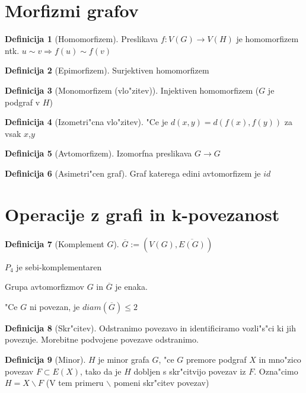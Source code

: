 \documentclass{article}
\theoremstyle{definition}
\newtheorem{definition}{Definicija}[section]
\begin{document}
	\section{Morfizmi grafov}
	
	\begin{definition}[Homomorfizem]
		Preslikava $f: V(G) \rightarrow V(H)$ je homomorfizem ntk. $u \sim v \Rightarrow f(u) \sim f(v)$
	\end{definition}
	\begin{definition}[Epimorfizem]
		Surjektiven homomorfizem 
	\end{definition}
	\begin{definition}[Monomorfizem (vlo"zitev)]
		Injektiven homomorfizem ($G$ je podgraf v $H$) 
	\end{definition}
	\begin{definition}[Izometri"cna vlo"zitev]
		"Ce je $d(x,y) = d(f(x), f(y))$ za vsak $x$,$y$
	\end{definition}
	\begin{definition}[Avtomorfizem]
		Izomorfna preslikava $G \rightarrow G$
	\end{definition}
	\begin{definition}[Asimetri"cen graf]
		Graf katerega edini avtomorfizem je $id$
	\end{definition}
	
	
	\section{Operacije z grafi in k-povezanost}	
	\begin{definition}[Komplement $G$]
		$\overline{G} := (V(G), \overline{E(G)})$
	\end{definition}
	$P_4$ je sebi-komplementaren
	
	Grupa avtomorfizmov $G$ in $\overline{G}$ je enaka.
	
	"Ce $G$ ni povezan, je $diam(\overline{G}) \leq 2$
	
	\begin{definition}[Skr"citev]
		Odstranimo povezavo in identificiramo vozli"s"ci ki jih povezuje.
		Morebitne podvojene povezave odstranimo.
	\end{definition} 
	
	\begin{definition}[Minor]
		$H$ je minor grafa $G$, "ce $G$ premore podgraf $X$ in mno"zico povezav $F \subset E(X)$, tako da je $H$ dobljen s skr"citvijo povezav iz $F$.
		Ozna"cimo $H = X \backslash F$ (V tem primeru $ \backslash $ pomeni skr"citev povezav)
	\end{definition} 
	
\end{document}
